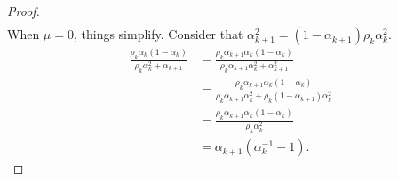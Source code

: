 \documentclass[12pt]{article}
\begin{document}
\begin{proof}
\begin{align*}
        \end{align*}
        When $\mu = 0$, things simplify. 
        Consider that $\alpha_{k +1}^2 = (1 - \alpha_{k + 1})\rho_k\alpha_k^2$. 
        \begin{align*}
            \frac{\rho_k\alpha_k(1 - \alpha_k)}{\rho_k\alpha_k^2 + \alpha_{k + 1}}
            &= 
            \frac{\rho_k\alpha_{k + 1}\alpha_k(1 - \alpha_k)}
            {\rho_k\alpha_{k + 1}\alpha_k^2 + \alpha_{k + 1}^2}
            \\
            &= 
            \frac{\rho_k\alpha_{k + 1}\alpha_k(1 - \alpha_k)}
            {\rho_k\alpha_{k + 1}\alpha_k^2 + \rho_k(1 - \alpha_{k + 1})\alpha_k^2}
            \\
            &= \frac{\rho_k\alpha_{k + 1}\alpha_k(1 - \alpha_k)}{\rho_k\alpha_k^2}
            \\
            &= \alpha_{k + 1}(\alpha_k^{-1} - 1). 
        \end{align*}
    \end{proof}
\end{document}
